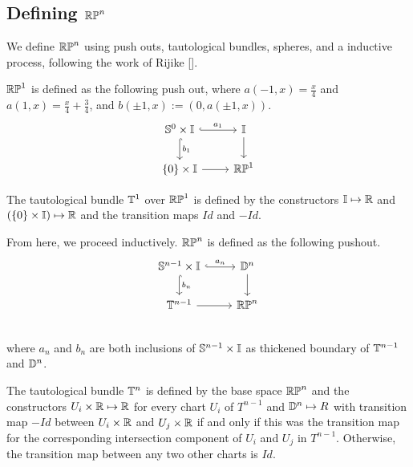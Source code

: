 \documentclass{amsart}
\begin{document}
\subsection{Defining $\mathbb{RP}^n$}

We define $\mathbb{RP}^n$ using push outs, tautological bundles, spheres, and a inductive process, following the work of Rijike [].

$\mathbb{RP}^1$ is defined as the following push out, where $a(-1,x) = \frac{x}{4}$ and $a(1,x)= \frac{x}{4} + \frac{3}{4}$, and $b (\pm 1, x) := (0, a(\pm1, x))$.\\
\[\begin{tikzcd}
\set{S}^0 \times \set{I} \arrow[r, hook, "a_1"] \arrow[d, hook, "b_1" ] & \set{I} \arrow[d]\\
\{0 \} \times \set{I} \arrow[r] & \set{RP}^1
\end{tikzcd}
\]

The tautological bundle $\mathbb{T}^1$ over $\mathbb{RP}^1$ is defined by the constructors $\mathbb{I} \mapsto \mathbb{R}$ and $(\{0\} \times \mathbb{I}) \mapsto \mathbb{R}$ and the transition maps $Id$ and $-Id$.

From here, we proceed inductively. $\mathbb{RP}^n$ is defined as the following pushout.\\
\[\begin{tikzcd}
\set{S}^{n-1} \times \set{I} \arrow[r, hook, "a_n"] \arrow[d, hook, "b_n" ] &\set{D}^{n} \arrow[d]\\
\set{T}^{n-1} \arrow[r] &\set{RP}^n\\
\end{tikzcd}
\] where $a_n$ and $b_n$ are both inclusions of $\mathbb{S}^{n-1} \times \mathbb{I} $ as thickened boundary of $\mathbb{T}^{n-1}$ and $\mathbb{D}^{n}$.

The tautological bundle $\mathbb{T}^n$ is defined by the base space $\mathbb{RP}^n$ and the constructors $U_i \times \mathbb{R} \mapsto \mathbb{R}$ for every chart $U_i$ of $T^{n-1}$ and $\mathbb{D}^n \mapsto R$ with transition map $-Id$ between $U_i \times \mathbb{R}$ and $U_j \times \mathbb{R}$ if and only if this was the transition map for the corresponding intersection component of  $U_i$ and $U_j$ in $T^{n-1}$. Otherwise, the transition map between any two other charts is $Id$.
\end{document}
